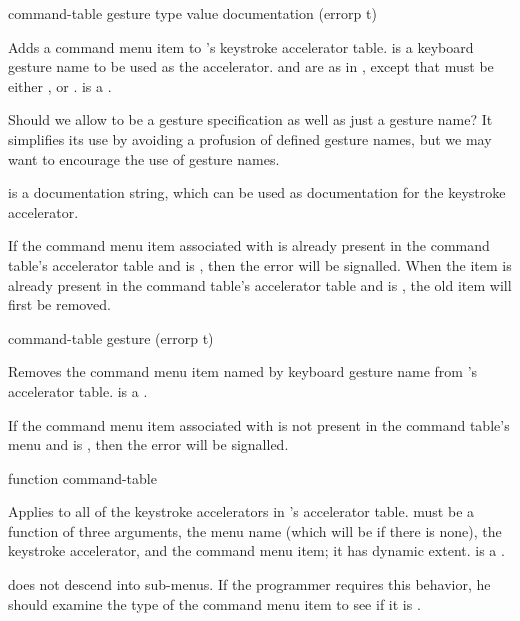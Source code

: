  {command-table gesture type value 
                                         \key documentation (errorp t)} 

Adds a command menu item to 's keystroke accelerator table.
 is a keyboard gesture name to be used as the accelerator.
 and  are as in , except
that  must be either ,  or .
 is a .

 {Should we allow  to be a gesture specification as
well as just a gesture name?  It simplifies its use by avoiding a profusion of
defined gesture names, but we may want to encourage the use of gesture names.}

 is a documentation string, which can be used as
documentation for the keystroke accelerator.

If the command menu item associated with  is already present in the
command table's accelerator table and  is , then the
 error will be signalled.  When the item is already
present in the command table's accelerator table and  is
, the old item will first be removed.


 {command-table gesture \key (errorp t)}  

Removes the command menu item named by keyboard gesture name  from
's accelerator table.   is a .

If the command menu item associated with  is not present in the
command table's menu and  is , then the
 error will be signalled.


 {function command-table}

Applies  to all of the keystroke accelerators in
's accelerator table.   must be a function of
three arguments, the menu name (which will be  if there is none), the
keystroke accelerator, and the command menu item; it has dynamic extent.
 is a .

 does not descend into sub-menus.  If the
programmer requires this behavior, he should examine the type of the command
menu item to see if it is .


